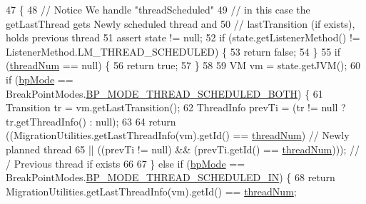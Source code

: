 \begin{DoxyCode}
47                                                            \{
48     \textcolor{comment}{// Notice We handle "threadScheduled"}
49     \textcolor{comment}{// in this case the getLastThread gets Newly scheduled thread and}
50     \textcolor{comment}{// lastTransition (if exists), holds previous thread}
51     assert state != null;
52     \textcolor{keywordflow}{if} (state.getListenerMethod() != ListenerMethod.LM\_THREAD\_SCHEDULED) \{
53       \textcolor{keywordflow}{return} \textcolor{keyword}{false};
54     \}
55     \textcolor{keywordflow}{if} (\hyperlink{classgov_1_1nasa_1_1jpf_1_1inspector_1_1server_1_1expression_1_1expressions_1_1_expression_breakpoint_thread_scheduled_ada71b9ee313dfce2cd7b53c32cb0d3a8}{threadNum} == null) \{
56       \textcolor{keywordflow}{return} \textcolor{keyword}{true};
57     \}
58 
59     VM vm = state.getJVM();
60     \textcolor{keywordflow}{if} (\hyperlink{classgov_1_1nasa_1_1jpf_1_1inspector_1_1server_1_1expression_1_1expressions_1_1_expression_breakpoint_thread_scheduled_af02859d11279a41920bbebb982288795}{bpMode} == BreakPointModes.\hyperlink{enumgov_1_1nasa_1_1jpf_1_1inspector_1_1server_1_1breakpoints_1_1_break_point_modes_a2cce1df014d496c660ff425aa45d24de}{BP\_MODE\_THREAD\_SCHEDULED\_BOTH}) \{
61       Transition tr = vm.getLastTransition();
62       ThreadInfo prevTi = (tr != null ? tr.getThreadInfo() : null);
63 
64       \textcolor{keywordflow}{return} ((MigrationUtilities.getLastThreadInfo(vm).getId() == \hyperlink{classgov_1_1nasa_1_1jpf_1_1inspector_1_1server_1_1expression_1_1expressions_1_1_expression_breakpoint_thread_scheduled_ada71b9ee313dfce2cd7b53c32cb0d3a8}{threadNum}) \textcolor{comment}{// Newly planned
       thread}
65       || ((prevTi != null) && (prevTi.getId() == \hyperlink{classgov_1_1nasa_1_1jpf_1_1inspector_1_1server_1_1expression_1_1expressions_1_1_expression_breakpoint_thread_scheduled_ada71b9ee313dfce2cd7b53c32cb0d3a8}{threadNum}))); \textcolor{comment}{// / Previous thread if exists}
66 
67     \} \textcolor{keywordflow}{else} \textcolor{keywordflow}{if} (\hyperlink{classgov_1_1nasa_1_1jpf_1_1inspector_1_1server_1_1expression_1_1expressions_1_1_expression_breakpoint_thread_scheduled_af02859d11279a41920bbebb982288795}{bpMode} == BreakPointModes.\hyperlink{enumgov_1_1nasa_1_1jpf_1_1inspector_1_1server_1_1breakpoints_1_1_break_point_modes_a3092604dadf48fb7ebceb8f285ad3b96}{BP\_MODE\_THREAD\_SCHEDULED\_IN}) \{
68       \textcolor{keywordflow}{return} MigrationUtilities.getLastThreadInfo(vm).getId() == \hyperlink{classgov_1_1nasa_1_1jpf_1_1inspector_1_1server_1_1expression_1_1expressions_1_1_expression_breakpoint_thread_scheduled_ada71b9ee313dfce2cd7b53c32cb0d3a8}{threadNum};

\end{DoxyCode}

